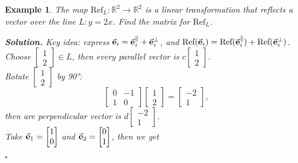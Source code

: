 \documentclass[12pt, a4paper]{article}
\newtheorem{eg}{Example}[subsection]
\newenvironment*{sol}{\par\indent\textbf{\textit{Solution. }}}{\hfill{$\square$}\par}
\def\R{{\mathbb{R}}}
\def\vece{\va{e}}
\begin{document}
\begin{eg}
The map $\text{Ref}_L:\R^2\rightarrow\R^2$ is a linear transformation that reflects a vector over the line $L: y=2x$. Find the matrix for $\text{Ref}_L$.\\
\begin{sol}
Key idea: express $\vece_i=\vece_i^\parallel+\vece_i^\perp$, and $\text{Ref}(\vece_i)=\text{Ref}(\vece_i^\parallel)+\text{Ref}(\vece_i^\perp)$. \\
Choose $\begin{bmatrix}1\\2\end{bmatrix} \in L$, then every parallel vector is $c\begin{bmatrix}1\\2\end{bmatrix}$.\\
Rotate $\begin{bmatrix}1\\2\end{bmatrix}$ by 90°: $$\begin{bmatrix}0&-1\\1&0\end{bmatrix}\begin{bmatrix}1\\2\end{bmatrix}=\begin{bmatrix}-2\\1\end{bmatrix}, $$
then are perpendicular vector is $d\begin{bmatrix}-2\\1\end{bmatrix}$. \\
Take $\vece_1=\begin{bmatrix}1\\0\end{bmatrix}$ and $\vece_2=\begin{bmatrix}0\\1\end{bmatrix}$, then we get

\end{sol}
\end{eg}
\end{document}
